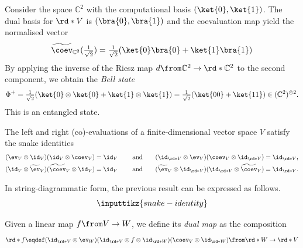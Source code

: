 \documentclass[a4paper,oneside, 12pt]{amsart}
\begin{document}
\begin{example}\label{ex:bell-state}
  Consider the space \( \mathbb{C}^{2}\) with the computational basis \((\ket{0}, \ket{1})\).
  The dual basis for \(\rd*{V}\) is \((\bra{0}, \bra{1})\)
  and the coevaluation map yield the normalised vector
  \begin{equation*}
    \widetilde{\coev}_{ \mathbb{C}^{2}}(\tfrac{1}{\sqrt{2}}) = \tfrac{1}{\sqrt2}(\ket{0}\bra{0} +\ket{1}\bra{1})
  \end{equation*}
  By applying the inverse of the Riesz map \(d \from \mathbb{C}^{2}\to \rd*{\mathbb{C}^{2}}\) to the second component, we obtain the \emph{Bell state}
  \begin{equation*}
    \Phi^{+} = \tfrac{1}{\sqrt{2}} (\ket{0} \otimes \ket{0} + \ket{1} \otimes \ket{1})
    = \tfrac{1}{\sqrt{2}} (\ket{00} + \ket{11}) \in ( \mathbb{C}^{2})^{\otimes 2}.
  \end{equation*}
  This is an entangled state.
\end{example}

\begin{lemma}\label{lem:cap-cup}
  The left and right (co)-evaluations of a finite-dimensional vector space \(V\) satisfy the snake identities
  \begin{align*}
    (\ev_{V}\otimes \id_{V})(\id_{V} \otimes \coev_{V}) = \id_{V}\qquad  \text{ and}\qquad
    (\id_{\rd*{V}}\otimes \ev_{V})(\coev_{V} \otimes \id_{\rd*{V}}) = \id_{\rd*{V}}, \\
    (\id_{V} \otimes \widetilde{\ev}_{V})(\widetilde{\coev}_{V} \otimes \id_{V}) = \id_{V}\qquad  \text{ and}\qquad
    (\widetilde{\ev}_{V} \otimes \id_{\rd*{V}})(\id_{\rd*{V}} \otimes \widetilde{\coev}_{V} ) = \id_{\rd*{V}}. \\
  \end{align*}
\end{lemma}
In string-diagrammatic form, the previous result can be expressed as follows.
\begin{equation*}
  \inputtikz{snake-identity}
\end{equation*}

\begin{definition}\label{def:dual-map}
  Given a linear map \(f\from V\to W\), we define its \emph{dual map} as the composition
  \begin{equation}
    \rd*{f} \eqdef (\id_{\rd*{V}}\otimes \ev_{W})(\id_{\rd*{V}}\otimes f \otimes \id_{\rd*{W}})(\coev_{V}\otimes \id_{\rd*{W}}) \from \rd*{W} \to \rd*{V}
  \end{equation}
\end{definition}
\end{document}
